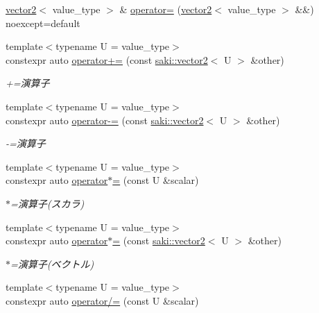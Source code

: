 \begin{DoxyCompactItemize}
\item 
\mbox{\hyperlink{classsaki_1_1vector2}{vector2}}$<$ value\+\_\+type $>$ \& \mbox{\hyperlink{classsaki_1_1vector2_affedbac760039d6968def3d5c5ed2f9f}{operator=}} (\mbox{\hyperlink{classsaki_1_1vector2}{vector2}}$<$ value\+\_\+type $>$ \&\&) noexcept=default
\item 
{\footnotesize template$<$typename U  = value\+\_\+type$>$ }\\constexpr auto \mbox{\hyperlink{classsaki_1_1vector2_a7d05381a39a16fd2b8a5bf48756101f3}{operator+=}} (const \mbox{\hyperlink{classsaki_1_1vector2}{saki\+::vector2}}$<$ U $>$ \&other)
\begin{DoxyCompactList}\small\item\em +=演算子 \end{DoxyCompactList}\item 
{\footnotesize template$<$typename U  = value\+\_\+type$>$ }\\constexpr auto \mbox{\hyperlink{classsaki_1_1vector2_a7812bbe241d7b5871f35da490fea19b4}{operator-\/=}} (const \mbox{\hyperlink{classsaki_1_1vector2}{saki\+::vector2}}$<$ U $>$ \&other)
\begin{DoxyCompactList}\small\item\em -\/=演算子 \end{DoxyCompactList}\item 
{\footnotesize template$<$typename U  = value\+\_\+type$>$ }\\constexpr auto \mbox{\hyperlink{classsaki_1_1vector2_a203906261424323192294dac71cc1f35}{operator$\ast$=}} (const U \&scalar)
\begin{DoxyCompactList}\small\item\em $\ast$=演算子(スカラ) \end{DoxyCompactList}\item 
{\footnotesize template$<$typename U  = value\+\_\+type$>$ }\\constexpr auto \mbox{\hyperlink{classsaki_1_1vector2_aec034723124adf2fd39736d4db3bb020}{operator$\ast$=}} (const \mbox{\hyperlink{classsaki_1_1vector2}{saki\+::vector2}}$<$ U $>$ \&other)
\begin{DoxyCompactList}\small\item\em $\ast$=演算子(ベクトル) \end{DoxyCompactList}\item 
{\footnotesize template$<$typename U  = value\+\_\+type$>$ }\\constexpr auto \mbox{\hyperlink{classsaki_1_1vector2_a5ee8bf11db397db036607f461455696c}{operator/=}} (const U \&scalar)

\end{DoxyCompactItemize}
